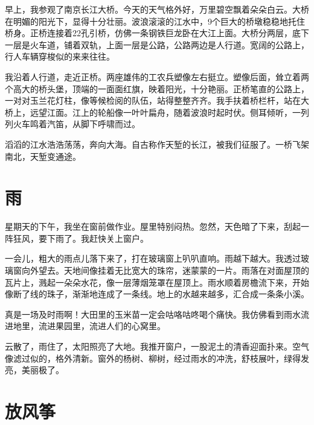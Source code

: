 \documentclass[12pt,UTF-8,openany]{ctexbook}
\begin{document}
\begin{Large}
    
    早上，我参观了南京长江大桥。今天的天气格外好，万里碧空飘着朵朵白云。大桥在明媚的阳光下，显得十分壮丽。波浪滚滚的江水中，9个巨大的桥墩稳稳地托住桥身。正桥连接着22孔引桥，仿佛一条钢铁巨龙卧在大江上面。大桥分两层，底下一层是火车道，铺着双轨，上面一层是公路，公路两边是人行道。宽阔的公路上，行人车辆穿梭似的来来往往。
    
    我沿着人行道，走近正桥。两座雄伟的工农兵塑像左右挺立。塑像后面，耸立着两个高大的桥头堡，顶端的一面面红旗，映着阳光，十分艳丽。正桥笔直的公路上，一对对玉兰花灯柱，像等候检阅的队伍，站得整整齐齐。我手扶着桥栏杆，站在大桥上，远望江面。江上的轮船像一叶叶扁舟，随着波浪时起时伏。侧耳倾听，一列列火车鸣着汽笛，从脚下呼啸而过。
    
    滔滔的江水浩浩荡荡，奔向大海。自古称作天堑的长江，被我们征服了。一桥飞架南北，天堑变通途。
    
\end{Large}

\chapter{雨}

\begin{Large}
    
    星期天的下午，我坐在窗前做作业。屋里特别闷热。忽然，天色暗了下来，刮起一阵狂风，要下雨了。我赶快关上窗户。
    
    一会儿，粗大的雨点儿落下来了，打在玻璃窗上叭叭直响。雨越下越大。我透过玻璃窗向外望去。天地间像挂着无比宽大的珠帘，迷蒙蒙的一片。雨落在对面屋顶的瓦片上，溅起一朵朵水花，像一层薄烟笼罩在屋顶上。雨水顺着房檐流下来，开始像断了线的珠子，渐渐地连成了一条线。地上的水越来越多，汇合成一条条小溪。
    
    真是一场及时雨啊！大田里的玉米苗一定会咕咯咕咚喝个痛快。我仿佛看到雨水流进地里，流进果园里，流进人们的心窝里。
    
    云散了，雨住了，太阳照亮了大地。我推开窗户，一股泥土的清香迎面扑来。空气像滤过似的，格外清新。窗外的杨树、柳树，经过雨水的冲洗，舒枝展叶，绿得发亮，美丽极了。
    
\end{Large}

\chapter{放风筝}
\end{document}
